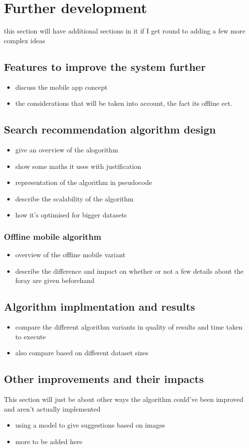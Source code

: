 
\chapter{Further development}
this section will have additional sections in it if I get round to adding a few more complex ideas

\section{Features to improve the system further}
\begin{itemize}
\item discuss the mobile app concept
\item the considerations that will be taken into account, the fact its offline ect.
\end{itemize}

\section{Search recommendation algorithm design}
\begin{itemize}
\item give an overview of the alogorithm
\item show some maths it uses with justification
\item representation of the algorithm in pseudocode
\item describe the scalability of the algorithm
\item how it's optimised for bigger datasets
\end{itemize}

\subsection{Offline mobile algorithm}
\begin{itemize}
\item overview of the offline mobile variant
\item describe the difference and impact on whether or not a few details about the foray are given beforehand
\end{itemize}

\section{Algorithm implmentation and results}
\begin{itemize}
\item compare the different algorithm variants in quality of results and time taken to execute
\item also compare based on different dataset sizes
\end{itemize}

\section{Other improvements and their impacts}
This section will just be about other ways the algorithm could've been improved and aren't actually implemented
\begin{itemize}
\item using a model to give suggestions based on images
\item more to be added here
\end{itemize}

